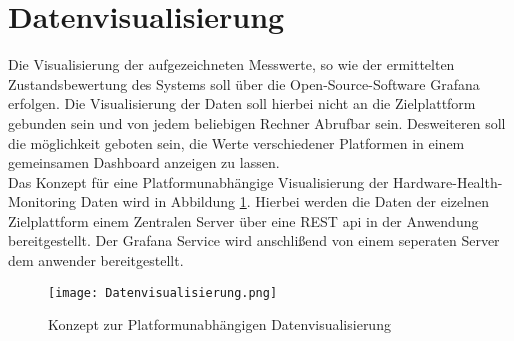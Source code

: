\newpage
\section{Datenvisualisierung}\label{sec:Datenvisualisierung}
Die Visualisierung der aufgezeichneten Messwerte, so wie der ermittelten Zustandsbewertung des Systems soll über die Open-Source-Software Grafana erfolgen. Die Visualisierung der Daten soll hierbei nicht an die Zielplattform gebunden sein und von jedem beliebigen Rechner Abrufbar sein. Desweiteren soll die möglichkeit geboten sein, die Werte verschiedener Platformen in einem gemeinsamen Dashboard anzeigen zu lassen.\\
Das Konzept für eine Platformunabhängige Visualisierung der Hardware-Health-Monitoring Daten wird in Abbildung \ref{fig:DatenvisualisierungKonzept}. Hierbei werden die Daten der eizelnen Zielplattform einem Zentralen Server über eine REST \ac{api} in der Anwendung bereitgestellt. Der Grafana Service wird anschlißend von einem seperaten Server dem anwender bereitgestellt.   
\begin{center}
    \begin{figure}[h!]
        \centering
        \texttt{[image: Datenvisualisierung.png]}
        \caption{Konzept zur Platformunabhängigen Datenvisualisierung}
        \label{fig:DatenvisualisierungKonzept}
    \end{figure}
\end{center}


